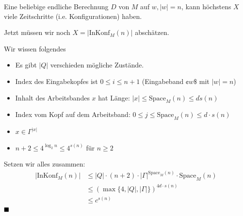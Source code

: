 \documentclass[a4paper, 11pt]{article}
\begin{document}
                            Eine beliebige endliche Berechnung $D$ von $M$ auf $w, |w| = n$, kann höchstens $X$ viele Zeitschritte (i.e. Konfigurationen) haben.
                        
                            Jetzt müssen wir noch $X = |\text{InKonf}_M(n)|$ abschätzen.
                            
                            Wir wissen folgendes
                            \begin{itemize}[label=$\blacktriangleright$]
                                
                                \item Es gibt $|Q|$ verschieden mögliche Zustände.
                                
                                \item Index des Eingabekopfes ist $0 \leq i \leq n+1$ (Eingabeband $\cent w \$$ mit $|w| = n$)
                                
                                \item Inhalt des Arbeitsbandes $x$ hat Länge: $|x| \leq \text{Space}_M(n) \leq d \dot s(n)$
                                
                                \item Index vom Kopf auf dem Arbeitsband: $0 \leq j \leq \text{Space}_M(n) \leq d \cdot s(n)$
                                
                                \item $x \in \Gamma^{|x|}$
                                
                                \item $n + 2 \leq 4^{\log_2n}\leq 4^{s(n)}$ für $n \geq 2$
                            \end{itemize}
                        
                    
                            Setzen wir alles zusammen:
                            \begin{align*}
                                |\text{InKonf}_M(n)| &\leq |Q| \cdot (n + 2) \cdot |\Gamma|^{\text{Space}_M(n)}\cdot \text{Space}_M(n)\\
                                                    &\leq (\max\{4, |Q|, |\Gamma|\})^{4d \cdot s(n)}\\
                                                    &\leq c^{s(n)}
                            \end{align*}
                            $\hfill\blacksquare$
\end{document}
